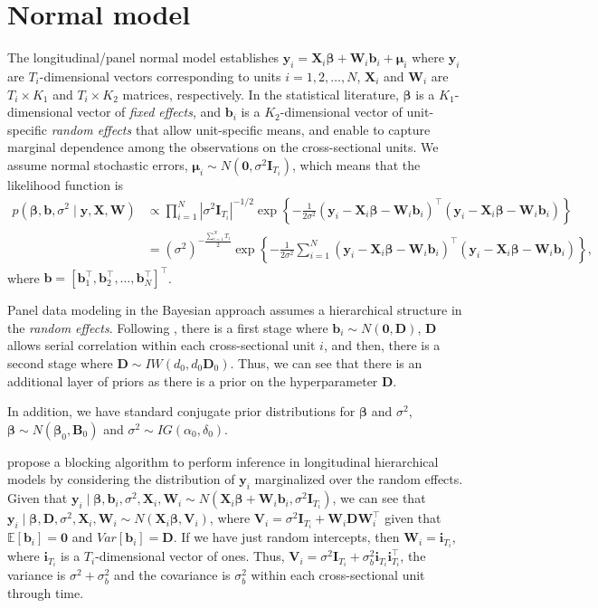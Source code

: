 \section{Normal model}\label{sec91}

The longitudinal/panel normal model establishes $\bm{y}_i=\bm{X}_i\bm{\beta}+\bm{W}_i\bm{b}_i+\bm{\mu}_i$ where $\bm{y}_i$ are $T_i$-dimensional vectors corresponding to units $i=1,2,\dots,N$, $\bm{X}_i$ and $\bm{W}_i$ are $T_i\times K_1$ and $T_i\times K_2$ matrices, respectively. In the statistical literature, $\bm{\beta}$ is a $K_1$-dimensional vector of \textit{fixed effects}, and $\bm{b}_i$ is a $K_2$-dimensional vector of unit-specific \textit{random effects} that allow unit-specific means, and enable to capture marginal dependence among the observations on the cross-sectional units. We assume normal stochastic errors, $\bm{\mu}_i\sim{N}(\bm{0},\sigma^2\bm{I}_{T_i})$, which means that the likelihood function is
{\footnotesize
\begin{align*}
	p(\bm{\beta},\bm{b},\sigma^2\mid \bm{y}, \bm{X},\bm{W}) & \propto \prod_{i=1}^N |\sigma^2\bm{I}_{T_i}|^{-1/2}\exp\left\{-\frac{1}{2\sigma^2}(\bm{y}_i-\bm{X}_i\bm{\beta}-\bm{W}_i\bm{b}_i)^{\top}(\bm{y}_i-\bm{X}_i\bm{\beta}-\bm{W}_i\bm{b}_i)\right\}\\
	& = (\sigma^2)^{-\frac{\sum_{i=1}^N T_i}{2}}\exp\left\{-\frac{1}{2\sigma^2}\sum_{i=1}^N(\bm{y}_i-\bm{X}_i\bm{\beta}-\bm{W}_i\bm{b}_i)^{\top}(\bm{y}_i-\bm{X}_i\bm{\beta}-\bm{W}_i\bm{b}_i)\right\},
\end{align*} 
}
where $\bm{b}=[\bm{b}_1^{\top}, \bm{b}_2^{\top},\dots, \bm{b}_N^{\top}]^{\top}$.

Panel data modeling in the Bayesian approach assumes a hierarchical structure in the \textit{random effects}. Following \cite{Chib1999}, there is a first stage where $\bm{b}_i\sim{N}(\bm{0},\bm{D})$, $\bm{D}$ allows serial correlation within each cross-sectional unit $i$, and then, there is a second stage where $\bm{D}\sim{I}{W}(d_0,d_0\bm{D}_0)$. Thus, we can see that there is an additional layer of priors as there is a prior on the hyperparameter $\bm{D}$. 

In addition, we have standard conjugate prior distributions for $\bm{\beta}$ and $\sigma^2$, $\bm{\beta} \sim {N}(\bm{\beta}_0,\bm{B}_0)$ and 
$\sigma^2 \sim {I}{G}(\alpha_0, \delta_0)$. 

\cite{Chib1999} propose a blocking algorithm to perform inference in longitudinal hierarchical models by considering the distribution of $\bm{y}_i$ marginalized over the random effects. Given that $\bm{y}_i\mid  \bm{\beta},\bm{b}_i,\sigma^2,\bm{X}_i,\bm{W}_i\sim N(\bm{X}_i\bm{\beta}+\bm{W}_i\bm{b}_i,\sigma^2\bm{I}_{T_i})$, we can see that    $\bm{y}_i\mid \bm{\beta},\bm{D},\sigma^2,\bm{X}_i,\bm{W}_i\sim{N}(\bm{X}_i\bm{\beta},\bm{V}_i)$, where $\bm{V}_i=\sigma^2\bm{I}_{T_i}+\bm{W}_i\bm{D}\bm{W}_i^{\top}$ given that $\mathbb{E}[\bm{b}_i]=\bm{0}$ and $Var[\bm{b}_i]=\bm{D}$. If we have just random intercepts, then $\bm{W}_i=\bm{i}_{T_i}$, where $\bm{i}_{T_i}$ is a $T_i$-dimensional vector of ones. Thus, $\bm{V}_i=\sigma^2\bm{I}_{T_i}+\sigma_{b}^2\bm{i}_{T_i}\bm{i}_{T_i}^{\top}$, the variance is $\sigma^2+\sigma^2_{b}$ and the covariance is $\sigma^2_{b}$ within each cross-sectional unit through time.


